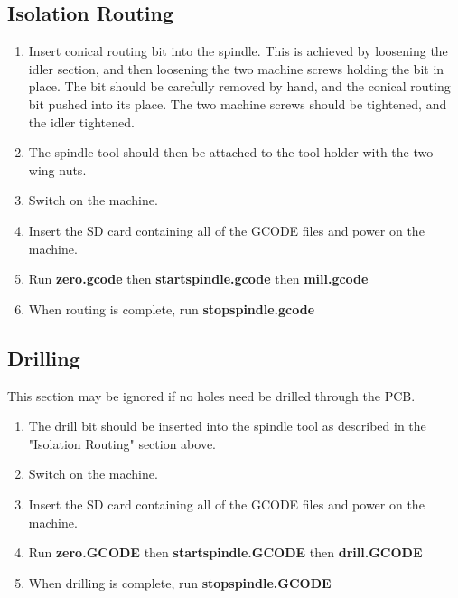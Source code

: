\documentclass[a4paper,11pt]{article}  %
\begin{document}
\subsection{Isolation Routing}
\begin{enumerate}

\item
Insert conical routing bit into the spindle. This is achieved by loosening
the idler section, and then loosening the two machine screws holding the bit in place.
The bit should be carefully removed by hand, and the conical routing bit 
pushed into its place. The two machine screws should be tightened, and the idler
tightened.

\item
The spindle tool should then be attached to the tool holder with the two
wing nuts.

\item
Switch on the machine.

\item
Insert the SD card containing all of the GCODE files and power on the 
machine.

\item
Run \textbf{zero.gcode} then \textbf{startspindle.gcode} then \textbf{mill.gcode}

\item
When routing is complete, run \textbf{stopspindle.gcode}

\end{enumerate}

\subsection{Drilling}
This section may be ignored if no holes need be drilled through the PCB.

\begin{enumerate}
\item
The drill bit should be inserted into the spindle tool as described in 
the "Isolation Routing" section above.

\item
Switch on the machine.

\item
Insert the SD card containing all of the GCODE files and power on the 
machine.

\item
Run \textbf{zero.GCODE} then \textbf{startspindle.GCODE} then \textbf{drill.GCODE}

\item
When drilling is complete, run \textbf{stopspindle.GCODE}

\end{enumerate}
\end{document}
